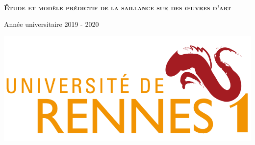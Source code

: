 \begin{titlepage}
\begin{center}
    \vspace{4cm}

    \textsc{\Huge \textbf{Étude et modèle prédictif de la saillance sur des œuvres d’art}}\\    

    \vfill

    \begin{minipage}{0.45\textwidth}
      \begin{flushleft}
        \vspace{0.5cm}
        {\large Année universitaire 2019 - 2020}
      \end{flushleft}
    \end{minipage}
    \begin{minipage}{0.45\textwidth}
      \begin{flushright}
        \includegraphics[width=0.9\columnwidth]{datas/logo_univ.png}~\\
      \end{flushright}
    \end{minipage}

  \end{center}
\end{titlepage}